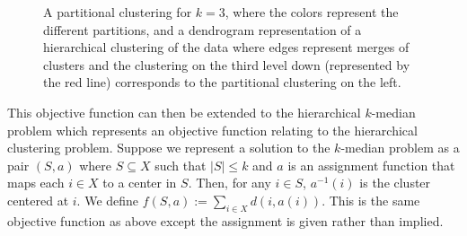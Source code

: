 \documentclass[conference, 10pt, final]{IEEEtran}
\begin{document}
\begin{figure}[!]
\centerline{
\hfil
{}}
\caption{A partitional clustering for $k=3$, where the colors represent the different partitions, and a dendrogram representation of a hierarchical clustering of the data where edges represent merges of clusters and the clustering on the third level down (represented by the red line) corresponds to the partitional clustering on the left.}
\end{figure}

This objective function can then be extended to the hierarchical $k$-median problem which represents an objective function relating to the hierarchical clustering problem. Suppose we represent a solution to the $k$-median problem as a pair $(S, a)$ where $S \subseteq X$ such that $|S| \leq k$ and $a$ is an assignment function that maps each $i \in X$ to a center in $S$. Then, for any $i \in S$, $a^{-1}(i)$ is the cluster centered at $i$. We define $f(S,a) := \sum_{i \in X} d(i, a(i))$. This is the same objective function as above except the assignment is given rather than implied.
\end{document}
